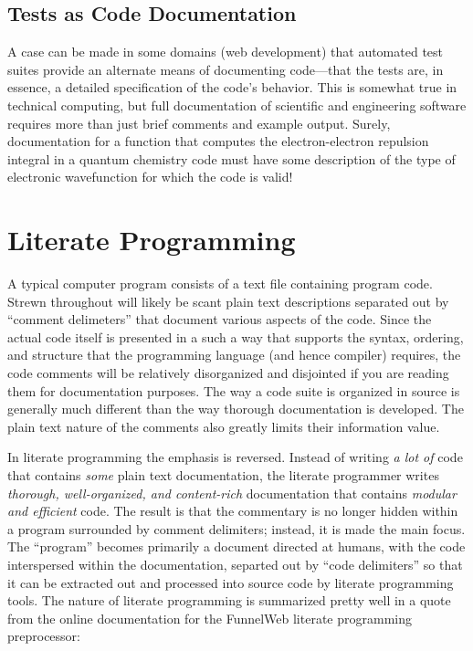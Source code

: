 \subsection{Tests as Code Documentation}
A case can be made in some domains (\eg web development) that automated test suites 
provide an alternate means of documenting code---that
the tests are, in essence, a detailed specification of the code's behavior. This is somewhat true in
technical computing, but full documentation of scientific and engineering software requires 
more than just brief comments and example output. Surely, documentation for a function that computes 
the electron-electron repulsion integral in a quantum chemistry code must have some description
of the type of electronic wavefunction for which the code is valid! 

\section{Literate Programming}

A typical computer program consists of a text file 
containing program code. Strewn throughout will likely be scant plain text descriptions separated out by 
``comment delimeters'' that document various aspects of the code.
Since the actual code itself is presented in a such a way that supports the syntax, ordering, and structure 
that the programming language (and hence compiler) requires, the code comments will
be relatively disorganized and disjointed if you are reading them for documentation purposes. 
The way a code suite is organized in source is generally much different than the way thorough documentation is 
developed. The plain text nature of the comments also greatly limits their information value.

In literate programming the emphasis is reversed. Instead of writing \textit{a lot of} code that contains 
\textit{some} plain text documentation, 
the literate programmer writes \textit{thorough, well-organized, and content-rich} documentation that contains 
\textit{modular and efficient} code. 
The result is that the commentary is no longer hidden within a program surrounded by 
comment delimiters; instead, it is made the main focus. 
The ``program'' becomes primarily a document directed at humans, with the 
code interspersed within the documentation, separted out by ``code delimiters'' so that it can be extracted 
out and processed into source code by literate programming tools. The nature of literate programming is 
summarized pretty well in a quote from the online documentation for the FunnelWeb literate programming
preprocessor:

